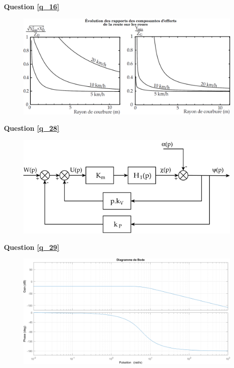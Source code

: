 \documentclass[10pt,fleqn]{article} %
\begin{document}
\textbf{Question \ref{q_16}}

\begin{figure}[H]
\centering
{\includegraphics[width=.8\linewidth]{dr_06.png}}
\end{figure}


\newpage

\textbf{Question \ref{q_28}}

\begin{figure}[H]
\centering
\includegraphics[width=.7\linewidth]{dr_05}
\end{figure}

\vspace{3cm}




\textbf{Question \ref{q_29}}

\begin{figure}[H]
\centering
{\includegraphics[width=.9\linewidth]{Bode.png}}
\end{figure}

\fi
\end{document}

